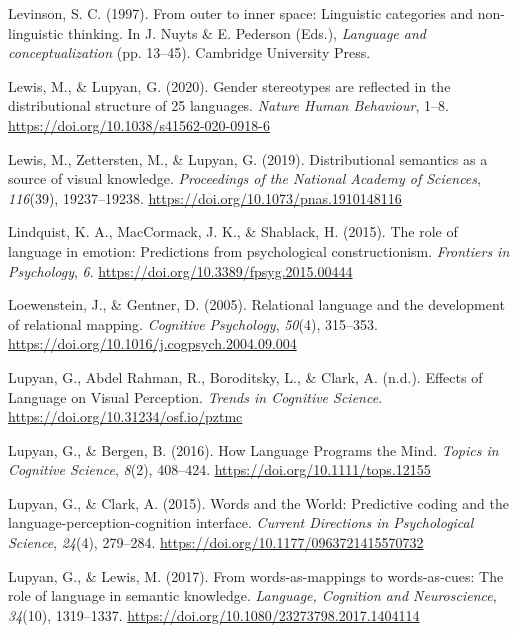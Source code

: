 \documentclass[11pt,man]{article}
\newlength{\cslhangindent}
\newenvironment{cslreferences}%
  {\setlength{\parindent}{0pt}%
  \everypar{\setlength{\hangindent}{\cslhangindent}}\ignorespaces}%
  {\par}
\begin{document}
\begin{cslreferences}
\leavevmode\hypertarget{ref-levinson_outer_1997}{}%
Levinson, S. C. (1997). From outer to inner space: Linguistic categories
and non-linguistic thinking. In J. Nuyts \& E. Pederson (Eds.),
\emph{Language and conceptualization} (pp. 13--45). Cambridge University
Press.

\leavevmode\hypertarget{ref-lewis_gender_2020}{}%
Lewis, M., \& Lupyan, G. (2020). Gender stereotypes are reflected in the
distributional structure of 25 languages. \emph{Nature Human Behaviour},
1--8. \url{https://doi.org/10.1038/s41562-020-0918-6}

\leavevmode\hypertarget{ref-lewis_distributional_2019}{}%
Lewis, M., Zettersten, M., \& Lupyan, G. (2019). Distributional
semantics as a source of visual knowledge. \emph{Proceedings of the
National Academy of Sciences}, \emph{116}(39), 19237--19238.
\url{https://doi.org/10.1073/pnas.1910148116}

\leavevmode\hypertarget{ref-lindquist_role_2015}{}%
Lindquist, K. A., MacCormack, J. K., \& Shablack, H. (2015). The role of
language in emotion: Predictions from psychological constructionism.
\emph{Frontiers in Psychology}, \emph{6}.
\url{https://doi.org/10.3389/fpsyg.2015.00444}

\leavevmode\hypertarget{ref-loewenstein_relational_2005}{}%
Loewenstein, J., \& Gentner, D. (2005). Relational language and the
development of relational mapping. \emph{Cognitive Psychology},
\emph{50}(4), 315--353.
\url{https://doi.org/10.1016/j.cogpsych.2004.09.004}

\leavevmode\hypertarget{ref-lupyan_effects_nodate}{}%
Lupyan, G., Abdel Rahman, R., Boroditsky, L., \& Clark, A. (n.d.).
Effects of Language on Visual Perception. \emph{Trends in Cognitive
Science}. \url{https://doi.org/10.31234/osf.io/pztmc}

\leavevmode\hypertarget{ref-lupyan_how_2016}{}%
Lupyan, G., \& Bergen, B. (2016). How Language Programs the Mind.
\emph{Topics in Cognitive Science}, \emph{8}(2), 408--424.
\url{https://doi.org/10.1111/tops.12155}

\leavevmode\hypertarget{ref-lupyan_words_2015}{}%
Lupyan, G., \& Clark, A. (2015). Words and the World: Predictive coding
and the language-perception-cognition interface. \emph{Current
Directions in Psychological Science}, \emph{24}(4), 279--284.
\url{https://doi.org/10.1177/0963721415570732}

\leavevmode\hypertarget{ref-lupyan_words-as-mappings_2017}{}%
Lupyan, G., \& Lewis, M. (2017). From words-as-mappings to
words-as-cues: The role of language in semantic knowledge.
\emph{Language, Cognition and Neuroscience}, \emph{34}(10), 1319--1337.
\url{https://doi.org/10.1080/23273798.2017.1404114}


\end{cslreferences}
\end{document}

